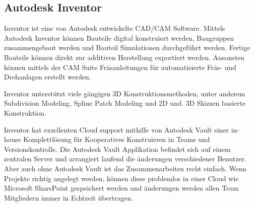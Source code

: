 \subsection{Autodesk Inventor}

Inventor ist eine von Autodesk entwickelte CAD/CAM Software. Mittels Autodesk Inventor können Bauteile digital konstruiert werden, Baugruppen zusammengebaut werden und Bauteil Simulationen durchgeführt werden. Fertige Bauteile können direkt zur additiven Herstellung exportiert werden. Ansonsten können mittels der CAM Suite Fräsanleitungen für automatisierte Fräs- und Drehanlagen erstellt werden.

Inventor unterstützt viele gängigen 3D Konstruktionsmethoden, unter anderem Subdivision Modeling, Spline Patch Modeling und 2D und. 3D Skizzen basierte Konstruktion.

Inventor hat exzellenten Cloud support mithilfe von Autodesk Vault einer in-house Komplettlösung für Kooperatives Konstruieren in Teams und Versionskontrolle. Die Autodesk Vault Applikation befindet sich auf einem zentralen Server und arrangiert laufend die änderungen verschiedener Benutzer. Aber auch ohne Autodesk Vault ist das Zusammenarbeiten recht einfach. Wenn Projekte richtig angelegt werden, können diese problemlos in einer Cloud wie Microsoft SharePoint gespeichert werden und änderungen werden allen Team Mitgliedern immer in Echtzeit übertragen.
